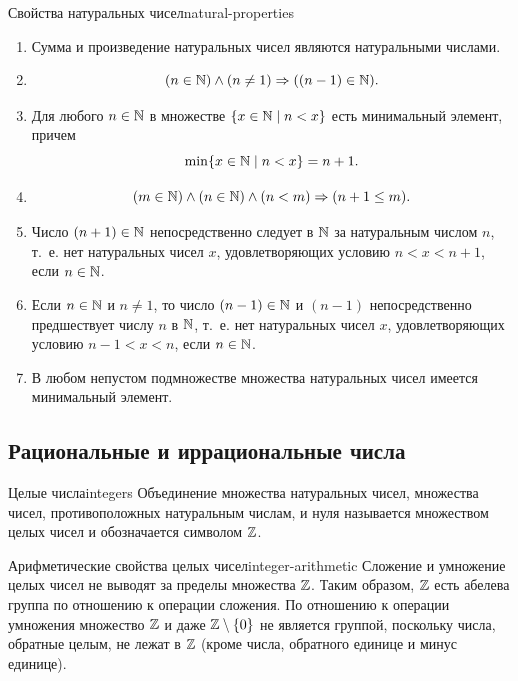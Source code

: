 \begin{properties}{Свойства натуральных чисел}{natural-properties}
  \begin{enumerate}[label=\arabic*${}^{\circ}$.]
    \item Сумма и произведение натуральных чисел являются натуральными
      числами.\par
    \item
      \[
        (n\in\mathbb{N})\land(n\ne1)\Rightarrow((n-1)\in\mathbb{N}).
      \]\par
    \item Для любого $n\in\mathbb{N}$ в множестве $\{x\in\mathbb{N}\mid n<x\}$ есть
      минимальный элемент, причем
      \[
        \min\{x\in\mathbb{N}\mid n<x\}=n+1.
      \]\par
    \item
      \[
        (m\in\mathbb{N})\land(n\in\mathbb{N})\land(n<m)\Rightarrow(n+1\le m).
      \]\par
    \item Число $(n+1)\in\mathbb{N}$ непосредственно следует в $\mathbb{N}$ за натуральным
      числом $n$, т.~е. нет натуральных чисел $x$, удовлетворяющих условию
      $n<x<n+1$, если $n\in\mathbb{N}$.\par
    \item Если $n\in\mathbb{N}$ и $n\ne1$, то число $(n-1)\in\mathbb{N}$ и $(n-1)$
      непосредственно предшествует числу $n$ в $\mathbb{N}$, т.~е. нет натуральных
      чисел $x$, удовлетворяющих условию $n-1<x<n$, если $n\in\mathbb{N}$.\par
    \item В любом непустом подмножестве множества натуральных чисел имеется
      минимальный элемент.
  \end{enumerate}
\end{properties}

\subsection{Рациональные и иррациональные числа}

\begin{definition}{Целые числа}{integers}
  Объединение множества натуральных чисел, множества чисел, противоположных
  натуральным числам, и нуля называется множеством целых чисел и
  обозначается символом $\mathbb{Z}$.
\end{definition}

\begin{properties}{Арифметические свойства целых чисел}{integer-arithmetic}
  Сложение и умножение целых чисел не выводят за пределы множества $\mathbb{Z}$.
  Таким образом, $\mathbb{Z}$ есть абелева группа по отношению к операции сложения.
  По отношению к операции умножения множество $\mathbb{Z}$ и даже
  $\mathbb{Z}\setminus\{0\}$ не является группой, поскольку числа, обратные целым,
  не лежат в $\mathbb{Z}$ (кроме числа, обратного единице и минус единице).
\end{properties}


